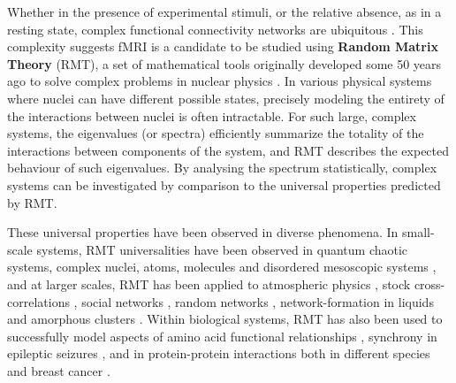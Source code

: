 \documentclass[10pt]{article}
\begin{document}
Whether in the presence of experimental stimuli, or the relative absence, as in a resting state,
complex functional connectivity networks are ubiquitous
\citep{bucknerBrainDefaultNetwork2008,foxCoverHumanBrain2005,gonzalez-castilloTaskbasedDynamicFunctional2018,hermundstadStructuralFoundationsRestingstate2013}.
This complexity suggests fMRI is a candidate to be studied using \textbf{Random Matrix Theory} (RMT), a set
of mathematical tools originally developed some 50 years ago to solve complex problems in nuclear
physics \citep{guhrRandommatrixTheoriesQuantum1998a,mehtaRandomMatrices2004}. In various
physical systems where nuclei can have different possible states, precisely modeling the entirety of
the interactions between nuclei is often intractable. For such large, complex systems, the
eigenvalues (or spectra) efficiently summarize the totality of the interactions between components
of the system, and RMT describes the expected behaviour of such eigenvalues. By analysing the
spectrum statistically, complex systems can be investigated by comparison to the universal
properties predicted by RMT.

\begin{sloppypar}
These universal properties have been observed in diverse phenomena. In small-scale systems, RMT
universalities have been observed in quantum chaotic systems, complex nuclei, atoms, molecules and
disordered mesoscopic systems
\citep{guhrRandommatrixTheoriesQuantum1998a,mehtaRandomMatrices2004,brodyRandommatrixPhysicsSpectrum1981,beenakkerRandommatrixTheoryQuantum1997,bohigasHigherOrderCorrelationsSpectra1985,wintgenLevelStatisticsQuantized1988,pandeySkewOrthogonalPolynomialsUniversality2001},
and at larger scales, RMT has been applied to atmospheric physics
\citep{santhanamStatisticsAtmosphericCorrelations2001}, stock cross-correlations
\citep{plerouRandomMatrixApproach2002} , social networks
\citep{jalanUncoveringRandomnessSuccess2014}, random networks
\citep{bandyopadhyayUniversalityComplexNetworks2007}, network-formation in liquids
\citep{sastrySpectralStatisticsInstantaneous2001,matharooSpectralStatisticsQuenched2009}  and
amorphous clusters
\citep{sarkarUniversalityVibrationalSpectra2004,matharooVibrationalSpectraAmorphous2005,matharooUniversalityVibrationalSpectra2008}.
Within biological systems, RMT has also been used to successfully model aspects of  amino acid
functional relationships \citep{bhadolaTargetingFunctionalMotifs2016}, synchrony in epileptic
seizures \citep{osorioPhasesynchronizationRandommatrixBased2011}, and in protein-protein
interactions both in different species \citep{agrawalQuantifyingRandomnessProtein2014} and breast
cancer \citep{raiRandomnessPreservedPatterns2015}.
\end{sloppypar}
\end{document}
